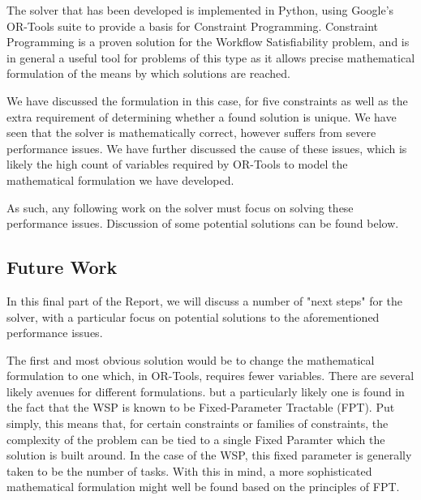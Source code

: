 \documentclass[11pt]{article}
\begin{document}
			The solver that has been developed is implemented in Python, using Google's OR-Tools suite to provide a basis for Constraint Programming.
			Constraint Programming is a proven solution for the Workflow Satisfiability problem\cite{benoist02}\cite{karapetyan19},
			and is in general a useful tool for problems of this type as it allows precise mathematical formulation of the means by which solutions are reached\cite{kotecha12}.

			We have discussed the formulation in this case, for five constraints as well as the extra requirement of determining whether a found solution is unique.
			We have seen that the solver is mathematically correct, however suffers from severe performance issues. We have further discussed the cause of these issues,
			which is likely the high count of variables required by OR-Tools to model the mathematical formulation we have developed.
			
			As such, any following work on the solver must focus on solving these performance issues.
			Discussion of some potential solutions can be found below.

		\subsection{Future Work}

			In this final part of the Report, we will discuss a number of "next steps" for the solver,
			with a particular focus on potential solutions to the aforementioned performance issues.

			The first and most obvious solution would be to change the mathematical formulation to one which,
			in OR-Tools, requires fewer variables. There are several likely avenues for different formulations.
			but a particularly likely one is found in the fact that the WSP is known to be Fixed-Parameter Tractable (FPT)\cite{cohen14}.
			Put simply, this means that, for certain constraints or families of constraints,
			the complexity of the problem can be tied to a single Fixed Paramter which the solution is built around.
			In the case of the WSP, this fixed parameter is generally taken to be the number of tasks\cite{cohen14}.
			With this in mind, a more sophisticated mathematical formulation might well be found based on the principles of FPT.
\end{document}

